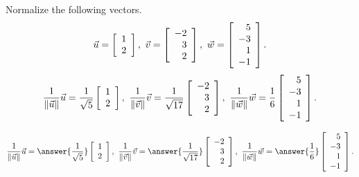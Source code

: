 \documentclass{ximera}
\author{Zack Reed}
\begin{document}
\begin{exercise}

  Normalize the following vectors.
  \begin{equation*}
    \vect{u}=\startmat{r}1\\2\stopmat, \quad
    \vect{v}=\startmat{r}-2\\3\\2\stopmat, \quad
    \vect{w}=\startmat{r}5\\-3\\1\\-1\stopmat.
  \end{equation*}
  \begin{equation*}
    \frac{1}{\norm{\vect{u}}}\vect{u} = \frac{1}{\sqrt{5}}\startmat{r}1\\2\stopmat,\quad
    \frac{1}{\norm{\vect{v}}}\vect{v} = \frac{1}{\sqrt{17}}\startmat{r}-2\\3\\2\stopmat,\quad
    \frac{1}{\norm{\vect{w}}}\vect{w} = \frac{1}{6}\startmat{r}5\\-3\\1\\-1\stopmat.
  \end{equation*}

  \begin{equation*}
    \frac{1}{\norm{\vect{u}}}\vect{u} = \answer{\frac{1}{\sqrt{5}}}\startmat{r}1\\2\stopmat,\quad
    \frac{1}{\norm{\vect{v}}}\vect{v} = \answer{\frac{1}{\sqrt{17}}}\startmat{r}-2\\3\\2\stopmat,\quad
    \frac{1}{\norm{\vect{w}}}\vect{w} = \answer{\frac{1}{6}}\startmat{r}5\\-3\\1\\-1\stopmat.
  \end{equation*}

\end{exercise}
\end{document}
